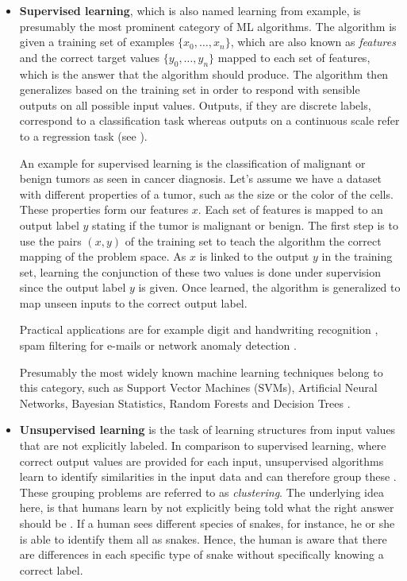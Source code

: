 \begin{itemize}

  \item[] \textbf{Supervised learning}, which is also named learning from example, is presumably the most prominent category of ML algorithms. The algorithm is given a training set of examples $\{x_0, \dots, x_n \}$, which are also known as \textit{features} and the correct target values $\{y_0, \dots, y_n \}$ mapped to each set of features, which is the answer that the algorithm should produce. The algorithm then generalizes based on the training set in order to respond with sensible outputs on all possible input values. Outputs, if they are discrete labels, correspond to a classification task whereas outputs on a continuous scale refer to a regression task (see \cite{Marsland:2009:MLA:1571643}).

An example for supervised learning is the classification of malignant or benign tumors as seen in cancer diagnosis. Let's assume we have a dataset with different properties of a tumor, such as the size or the color of the cells. These properties form our features $x$. Each set of features is mapped to an output label $y$ stating if the tumor is malignant or benign. The first step is to use the pairs $(x, y)$ of the training set to teach the algorithm the correct mapping of the problem space. As $x$ is linked to the output $y$ in the training set, learning the conjunction of these two values is done under supervision since the output label $y$ is given. Once learned, the algorithm is generalized to map unseen inputs to the correct output label.

Practical applications are for example digit and handwriting recognition \cite{lecun1990handwritten}, spam filtering \cite{guzella2009review} for e-mails or network anomaly detection \cite{lee2010uncovering}.

Presumably the most widely known machine learning techniques belong to this category, such as Support Vector Machines (SVMs), Artificial Neural Networks, Bayesian Statistics, Random Forests and Decision Trees \cite{Duda:2000:PC:954544}.\\


  \item[] \textbf{Unsupervised learning} is the task of learning structures from input values that are not explicitly labeled. In comparison to supervised learning, where correct output values are provided for each input, unsupervised algorithms learn to identify similarities in the input data and can therefore group these \cite{Duda:2000:PC:954544}. These grouping problems are referred to as \textit{clustering}. The underlying idea here, is that humans learn by not explicitly being told what the right answer should be \cite{Marsland:2009:MLA:1571643}. If a human sees different species of snakes, for instance, he or she is able to identify them all as snakes. Hence, the human is aware that there are differences in each specific type of snake without specifically knowing a correct label.


\end{itemize}
